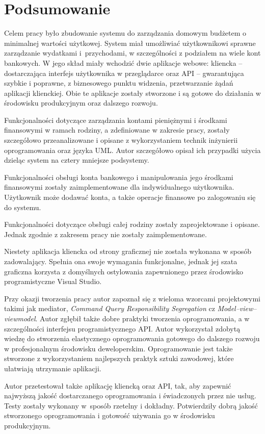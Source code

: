 \chapter{Podsumowanie}
\label{chap:podsumowanie}
Celem pracy było zbudowanie systemu do zarządzania domowym budżetem o minimalnej wartości użytkowej. System miał umożliwiać użytkownikowi sprawne zarządzanie wydatkami i~przychodami, w szczególności z podziałem na wiele kont bankowych. W jego skład miały wchodzić dwie aplikacje webowe: kliencka -- dostarczająca interfejs użytkownika w przeglądarce oraz API -- gwarantująca szybkie i poprawne, z biznesowego punktu widzenia, przetwarzanie żądań aplikacji klienckiej. Obie te aplikacje zostały stworzone i są gotowe do działania w środowisku produkcyjnym oraz dalszego rozwoju.

Funkcjonalności dotyczące zarządzania kontami pieniężnymi i środkami finansowymi w ramach rodziny, a zdefiniowane w zakresie pracy, zostały szczegółowo przeanalizowane i opisane z wykorzystaniem technik inżynierii oprogramowania oraz języka UML. Autor szczegółowo opisał ich przypadki użycia dzieląc system na cztery mniejsze podsystemy.

Funkcjonalności obsługi konta bankowego i manipulowania jego środkami finansowymi zostały zaimplementowane dla indywidualnego użytkownika. Użytkownik może dodawać konta, a także operacje finansowe po zalogowaniu się do systemu.

Funkcjonalności dotyczące obsługi całej rodziny zostały zaprojektowane i opisane. Jednak zgodnie z zakresem pracy nie zostały zaimplementowane.

Niestety aplikacja kliencka od strony graficznej nie została wykonana w sposób zadowalający. Spełnia ona swoje wymagania funkcjonalne, jednak jej szata graficzna korzysta z domyślnych ostylowania zapewnionego przez środowisko programistyczne Visual Studio.

Przy okazji tworzenia pracy autor zapoznał się z wieloma wzorcami projektowymi takimi jak mediator, \emph{Command Query Responsibility Segregation} cz \emph{Model–view–viewmodel}. Autor zgłębił także dobre praktyki tworzenia oprogramowania, a w szczególności interfejsu programistycznego API. Autor wykorzystał zdobytą wiedzę do stworzenia elastycznego oprogramowania gotowego do dalszego rozwoju w profesjonalnym środowisku deweloperskim. Oprogramowanie jest także stworzone z wykorzystaniem najlepszych praktyk sztuki zawodowej, które ułatwiają utrzymanie aplikacji.

Autor przetestował także aplikację kliencką oraz API, tak, aby zapewnić najwyższą jakość dostarczanego oprogramowania i świadczonych przez nie usług. Testy zostały wykonany w~sposób rzetelny i dokładny. Potwierdziły dobrą jakość stworzonego oprogramowania i gotowość używania go w środowisku produkcyjnym.

